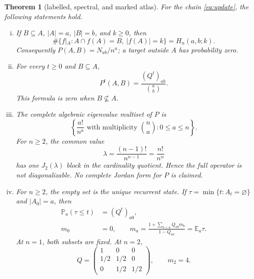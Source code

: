 \documentclass[a4paper,10pt]{amsart}
\newtheorem{theorem}{Theorem}
\theoremstyle{remark}
\newcommand{\E}{\mathbb E}
\newcommand{\Prb}{\mathbb P}
\begin{document}
\begin{theorem}[labelled, spectral, and marked atlas]\label{thm:main}
For the chain \eqref{eq:update}, the following statements hold.
\begin{enumerate}[(i)]
\item If $B\subseteq A$, $|A|=a$, $|B|=b$, and $k\ge0$, then
\begin{equation}\label{eq:marked-one}
 \#\{f|_A:A\cap f(A)=B,\ |f(A)|=k\}=H_n(a,b;k).
\end{equation}
Consequently $P(A,B)=N_{ab}/n^a$; a target outside $A$ has probability zero.

\item For every $t\ge0$ and $B\subseteq A$,
\begin{equation}\label{eq:alltime}
        P^t(A,B)=\frac{(Q^t)_{ab}}{\binom ab}.
\end{equation}
This formula is zero when $B\nsubseteq A$.

\item The complete algebraic eigenvalue multiset of $P$ is
\begin{equation}\label{eq:spectrum}
 \left\{\frac{a!}{n^a}\text{ with multiplicity }\binom na:
                  0\le a\le n\right\}.
\end{equation}
For $n\ge2$, the common value
\begin{equation}\label{eq:collision}
 \lambda=\frac{(n-1)!}{n^{n-1}}=\frac{n!}{n^n}
\end{equation}
has one $J_2(\lambda)$ block in the cardinality quotient.  Hence the full
operator is not diagonalizable.  No complete Jordan form for $P$ is claimed.

\item For $n\ge2$, the empty set is the unique recurrent state.  If
$\tau=\min\{t:A_t=\varnothing\}$ and $|A_0|=a$, then
\begin{align}
 \Prb_a(\tau\le t)&=(Q^t)_{a0},                         \label{eq:cdf}\\
 m_0&=0,\qquad
 m_a=\frac{1+\sum_{b<a}Q_{ab}m_b}{1-Q_{aa}}=\E_a\tau.
                                                               \label{eq:mean}
\end{align}
At $n=1$, both subsets are fixed.  At $n=2$,
\begin{equation}\label{eq:n2}
 Q=\begin{pmatrix}1&0&0\\[1mm]1/2&1/2&0\\[1mm]0&1/2&1/2\end{pmatrix},
 \qquad m_2=4.
\end{equation}


\end{enumerate}
\end{theorem}
\end{document}

